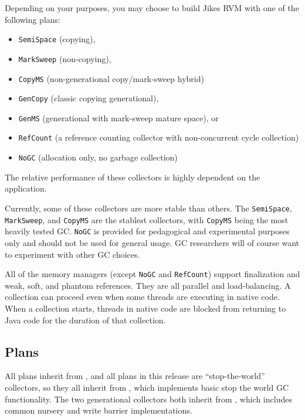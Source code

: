 Depending on your purposes, you may choose to build Jikes RVM with one
of the following plans:
\begin{itemize}
\item \texttt{SemiSpace} (copying),
\item \texttt{MarkSweep} (non-copying),
\item \texttt{CopyMS} (non-generational copy/mark-sweep hybrid)
\item \texttt{GenCopy} (classic copying generational),
\item \texttt{GenMS} (generational with mark-sweep mature space), or
\item \texttt{RefCount} (a reference counting collector with non-concurrent cycle collection)
\item \texttt{NoGC} (allocation only, no garbage collection)
\end{itemize}
The relative performance of these collectors is highly dependent on
the application. 


Currently, some of these collectors are more stable than others. 
The \texttt{SemiSpace}, \texttt{MarkSweep}, and \texttt{CopyMS} 
are the stablest collectors, with \texttt{CopyMS} being the
most heavily tested GC.  \texttt{NoGC} is provided for pedagogical and
experimental purposes only and should not be used for general usage.
GC researchers will of course want to experiment with other GC choices.

All of the memory managers (except \texttt{NoGC} and \texttt{RefCount}) 
support finalization and weak, soft, and phantom references.  They are all parallel 
and load-balancing.  A collection can proceed even when some threads are
executing in native code. When a collection starts, threads in native
code are blocked from returning to Java code for the duration of that
collection.

\subsection{Plans} \label{sssec:plans}

All plans inherit from ,
and all plans in this release are ``stop-the-world'' collectors, so
they all inherit from
, which implements
basic stop the world GC functionality.  The two generational
collectors both inherit from
, which includes
common nursery and write barrier implementations.


